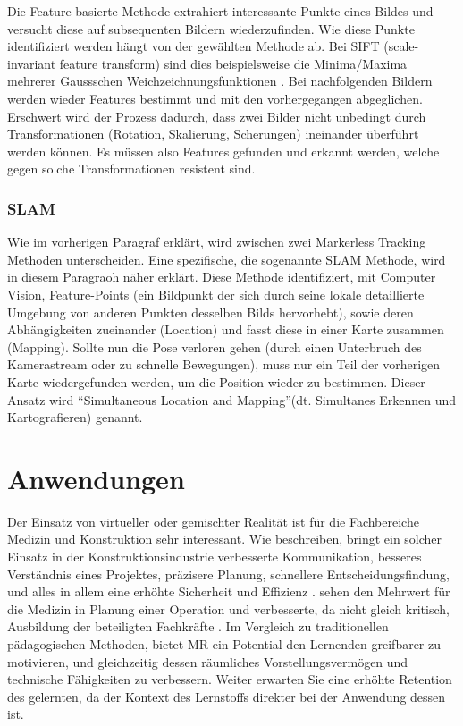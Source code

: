 \documentclass[a4paper]{scrreprt}
\begin{document}
Die Feature-basierte Methode extrahiert interessante Punkte eines Bildes und versucht diese auf subsequenten Bildern wiederzufinden. Wie diese Punkte identifiziert werden hängt von der gewählten Methode ab. Bei SIFT (scale-invariant feature transform) sind dies beispielsweise die Minima/Maxima mehrerer Gaussschen Weichzeichnungsfunktionen \parencite{Lowe1999}. Bei nachfolgenden Bildern werden wieder Features bestimmt und mit den vorhergegangen abgeglichen. Erschwert wird der Prozess dadurch, dass zwei Bilder nicht unbedingt durch Transformationen (Rotation, Skalierung, Scherungen) ineinander überführt werden können. Es müssen also Features gefunden und erkannt werden, welche gegen solche Transformationen resistent sind.

\subsubsection{SLAM}
Wie im vorherigen Paragraf erklärt, wird zwischen zwei Markerless Tracking Methoden unterscheiden. Eine spezifische, die sogenannte SLAM Methode, wird in diesem Paragraoh näher erklärt. Diese Methode identifiziert, mit Computer Vision, Feature-Points (ein Bildpunkt der sich durch seine lokale detaillierte Umgebung von anderen Punkten desselben Bilds hervorhebt), sowie deren Abhängigkeiten zueinander (Location) und fasst diese in einer Karte zusammen (Mapping). Sollte nun die Pose verloren gehen (durch einen Unterbruch des Kamerastream oder zu schnelle Bewegungen), muss nur ein Teil der vorherigen Karte wiedergefunden werden, um die Position wieder zu bestimmen. Dieser Ansatz wird \textquotedblleft Simultaneous Location and Mapping\textquotedblright (dt. Simultanes Erkennen und Kartografieren) genannt.

\section{Anwendungen}

Der Einsatz von virtueller oder gemischter Realität ist für die Fachbereiche Medizin und Konstruktion sehr interessant. Wie \citeauthor{Piroozfar2018} beschreiben, bringt ein solcher Einsatz in der Konstruktionsindustrie verbesserte Kommunikation, besseres Verständnis eines Projektes, präzisere Planung, schnellere Entscheidungsfindung, und alles in allem eine erhöhte Sicherheit und Effizienz \parencite{Piroozfar2018}. \citeauthor{Pelargos2017} sehen den Mehrwert für die Medizin in Planung einer Operation und verbesserte, da nicht gleich kritisch, Ausbildung der beteiligten Fachkräfte \parencite{Pelargos2017}. Im Vergleich zu traditionellen pädagogischen Methoden, bietet MR ein Potential den Lernenden greifbarer zu motivieren, und gleichzeitig dessen räumliches Vorstellungsvermögen und technische Fähigkeiten zu verbessern. Weiter erwarten Sie eine erhöhte Retention des gelernten, da der Kontext des Lernstoffs direkter bei der Anwendung dessen ist.
\end{document}
